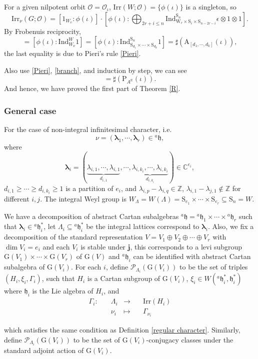 \documentclass[12pt, a4paper]{amsart}
\numberwithin{equation}{section}
\newcommand{\blam}{{\boldsymbol{\lambda}}}
\newcommand{\BC}{{\mathbb {C}}}
\newcommand{\BR}{{\mathbb {R}}}
\newcommand{\BZ}{{\mathbb {Z}}}
\newcommand{\CO}{{\mathcal {O}}}
\newcommand{\CP}{{\mathcal {P}}}
\newcommand{\fh}{\mathfrak{h}}
\newcommand{\G}{{\mathrm{G}}}
\newcommand{\A}{{\mathrm{A}}}
\newcommand{\Ind}{{\mathrm{Ind}}}
\newcommand{\Irr}{{\mathrm{Irr}}}
\newcommand{\defmap}[5]{
           \begin{equation*}
              \begin{aligned}
                   #1:\quad  & #2 &\longrightarrow &\quad #3 \\
                      \quad  & #4    &\longmapsto  &\quad #5
              \end{aligned}
           \end{equation*}
          }
\begin{document}
For a given nilpotent orbit $\CO = \CO_{\iota}$, $\Irr(W;\CO) = \{\phi(\iota)\}$ is a singleton, so 
\begin{equation}
    \Irr_{\nu}(G;\CO) = [1_{W_v}: \phi(\iota)]\cdot [\phi(\iota): \bigoplus_{2r + i \leq n} \Ind _{\mathrm{W}_{r} \times \mathrm{S}_{i} \times \mathrm{S}_{n-2r-i}}^{\mathrm{S}_{n}} \epsilon \otimes 1 \otimes 1].
\end{equation}
By Frobenuis reciprocity, 
\begin{equation}
[1_{W_\nu}: \phi(\iota)] = [\phi(\iota): \Ind_{W_\nu}^{W}1] = [\phi(\iota): \Ind_{\mathrm{S}_{d_1} \times \cdots \times \mathrm{S}_{d_k}}^{\mathrm{S}_n}1] = \sharp(\A_{[d_1,\cdots,d_k]}(\iota)),
\end{equation}
the last equality is due to Pieri's rule \ref{Pieri}.

Also use \ref{Pieri}, \ref{branch}, and induction by step, we can see
\begin{equation}
    [\phi(\iota): \bigoplus_{2r + i \leq n} \Ind _{\mathrm{W}_{r} \times \mathrm{S}_{i} \times \mathrm{S}_{n-2r-i}}^{\mathrm{S}_{n}} \epsilon \otimes 1 \otimes 1] = \sharp(\mathrm{P}_{A^\BR}(\iota)).
\end{equation}
And hence, we have proved the first part of Theorem \ref{R}.


\subsubsection{General case}
For the case of non-integral infinitesimal character, i.e. 
$$\nu = (\blam_1, \cdots, \blam_r) \in {^{a}\fh},$$ 
where 
$$\blam_i = (\underbrace{\lambda_{i,1}, \cdots, \lambda_{i,1}}_{d_{i,1}},\cdots,\underbrace{\lambda_{i,k_i},\cdots,\lambda_{i,k_i}}_{d_{i,k_i}}) \in \BC^{e_i},$$  $d_{i,1} \geq \cdots \geq d_{i,k_i} \geq 1$ is a partition of $e_i$, and $\lambda_{i,p} - \lambda_{i,q} \in \BZ$, $\lambda_{i,1} - \lambda_{j,1} \notin \BZ$ for different $i,j$. The integral Weyl group is $W_{\Lambda} = W(\Lambda) = \mathrm{S}_{e_1} \times \cdots \times \mathrm{S}_{e_r} \subseteq \mathrm{S}_{n} = W$. 

We have a decomposition of abstract Cartan subalgebras $^{a}\fh = {^{a}\fh_1} \times \cdots \times {^{a}\fh_r}$ such that $\blam_i \in {^{a}\fh_i^*}$, let $\Lambda_i \subseteq {^{a}\fh_i^*}$ be the integral lattices correspond to $\blam_i$. Also, we fix a decomposition of the standard representation $V = V_1 \oplus V_2 \oplus \cdots \oplus V_r$ with $\dim V_i = e_i$ and each $V_i$ is stable under $\mathbf{j}$, this corresponds to a levi subgroup $\G(V_1) \times \cdots \times \G(V_r)$ of $\G(V)$ and $^{a}\fh_i$ can be identified with abstract Cartan subalgebra of $\G(V_i)$. For each $i$, define $\mathscr{P}_{\Lambda_i}(\G(V_i))$ to be the set of triples $(H_i, \xi_i, \Gamma_i)$, such that $H_i$ is a Cartan subgroup of $\G(V_i)$, $\xi_i \in W({^{a}\fh_i^*},\fh_i^*)$ where $\fh_i$ is the Lie algebra of $H_i$, and \defmap{\Gamma_i}{\Lambda_i}{\Irr(H_i)}{\nu_i}{\Gamma_{\nu_i}}
which satisfies the same condition as Definition \ref{regular character}. Similarly, define $\CP_{\Lambda_i}(\G(V_i))$ to be the set of $\G(V_i)$-conjugacy classes under the standard adjoint action of $\G(V_i)$.
\end{document}
